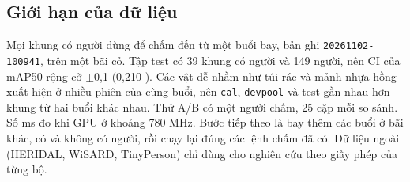 \subsection{Giới hạn của dữ liệu}

Mọi khung có người dùng để chấm đến từ một buổi bay, bản ghi \texttt{20261102-100941}, trên một bãi cỏ. Tập test có 39 khung có người và 149 người, nên CI của mAP50 rộng cỡ $\pm$0,1 (0,210 ). Các vật dễ nhầm như túi rác và mảnh nhựa hồng xuất hiện ở nhiều phiên của cùng buổi, nên \texttt{cal}, \texttt{devpool} và test gần nhau hơn khung từ hai buổi khác nhau. Thử A/B có một người chấm, 25 cặp mỗi so sánh. Số ms đo khi GPU ở khoảng 780 MHz. Bước tiếp theo là bay thêm các buổi ở bãi khác, có và không có người, rồi chạy lại đúng các lệnh chấm đã có. Dữ liệu ngoài (HERIDAL, WiSARD, TinyPerson) chỉ dùng cho nghiên cứu theo giấy phép của từng bộ.
